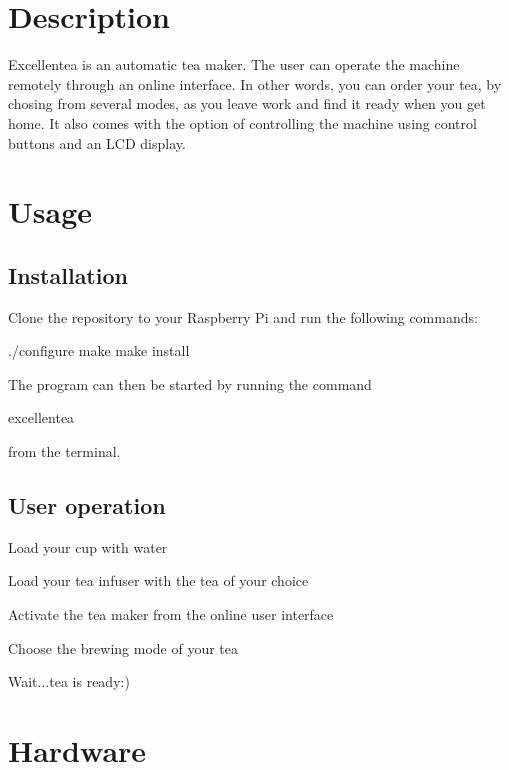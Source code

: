 

\section*{Description}

Excellentea is an automatic tea maker. The user can operate the machine remotely through an online interface. In other words, you can order your tea, by chosing from several modes, as you leave work and find it ready when you get home. It also comes with the option of controlling the machine using control buttons and an L\+CD display.

\section*{Usage}

\subsection*{Installation}

Clone the repository to your Raspberry Pi and run the following commands\+:


\begin{DoxyCode}
./configure
make
make install
\end{DoxyCode}
 The program can then be started by running the command


\begin{DoxyCode}
excellentea
\end{DoxyCode}
 from the terminal.

\subsection*{User operation}


\begin{DoxyEnumerate}
\item Load your cup with water
\item Load your tea infuser with the tea of your choice
\item Activate the tea maker from the online user interface
\item Choose the brewing mode of your tea
\item Wait...tea is ready\+:)
\end{DoxyEnumerate}

\section*{Hardware}

